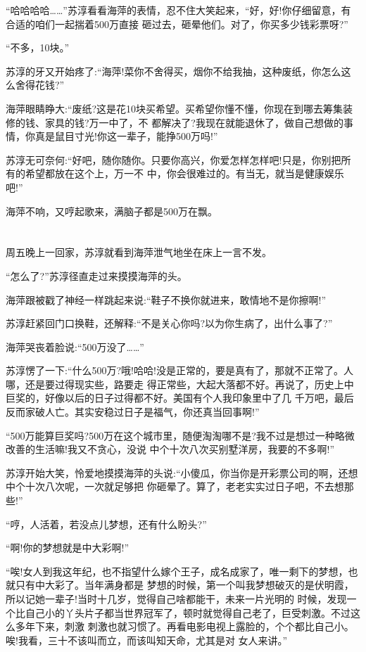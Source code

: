 \documentclass[11pt,a4paper,onecolumn]{article}
\begin{document}
``哈哈哈哈……''苏淳看看海萍的表情，忍不住大笑起来，``好，好!你仔细留意，有合适的咱们一起揣着500万直接
砸过去，砸晕他们。对了，你买多少钱彩票呀?''

``不多，10块。''

苏淳的牙又开始疼了:``海萍!菜你不舍得买，烟你不给我抽，这种废纸，你怎么这么舍得花钱?''

海萍眼睛睁大:``废纸?这是花10块买希望。买希望你懂不懂，你现在到哪去筹集装修的钱、家具的钱?万一中了，不
都解决了?我现在就能退休了，做自己想做的事情，你真是鼠目寸光!你这一辈子，能挣500万吗!''

苏淳无可奈何:``好吧，随你随你。只要你高兴，你爱怎样怎样吧!只是，你别把所有的希望都放在这个上，万一不
中，你会很难过的。有当无，就当是健康娱乐吧!''

海萍不响，又哼起歌来，满脑子都是500万在飘。

\section[\thesection]{}

周五晚上一回家，苏淳就看到海萍泄气地坐在床上一言不发。

``怎么了?''苏淳径直走过来摸摸海萍的头。

海萍跟被戳了神经一样跳起来说:``鞋子不换你就进来，敢情地不是你擦啊!''

苏淳赶紧回门口换鞋，还解释:``不是关心你吗?以为你生病了，出什么事了?''

海萍哭丧着脸说:``500万没了……''

苏淳愣了一下:``什么500万?哦!哈哈!没是正常的，要是真有了，那就不正常了。人哪，还是要过得现实些，路要走
得正常些，大起大落都不好。再说了，历史上中巨奖的，好像以后的日子过得都不好。美国有个人我印象里中了几
千万吧，最后反而家破人亡。其实安稳过日子是福气，你还真当回事啊!''

``500万能算巨奖吗?500万在这个城市里，随便淘淘哪不是?我不过是想过一种略微改善的生活嘛!我又不贪心，没说
中个十次八次买别墅洋房，我要的不多啊!''

苏淳开始大笑，怜爱地摸摸海萍的头说:``小傻瓜，你当你是开彩票公司的啊，还想中个十次八次呢，一次就足够把
你砸晕了。算了，老老实实过日子吧，不去想那些!''

``哼，人活着，若没点儿梦想，还有什么盼头?''

``啊!你的梦想就是中大彩啊!''

``唉!女人到我这年纪，也不指望什么嫁个王子，成名成家了，唯一剩下的梦想，也就只有中大彩了。当年满身都是
梦想的时候，第一个叫我梦想破灭的是伏明霞，所以记她一辈子!当时十几岁，觉得自己啥都能干，未来一片光明的
时候，发现一个比自己小的丫头片子都当世界冠军了，顿时就觉得自己老了，巨受刺激。不过这么多年下来，刺激
刺激也就习惯了。再看电影电视上露脸的，个个都比自己小。唉!我看，三十不该叫而立，而该叫知天命，尤其是对
女人来讲。''
\end{document}
